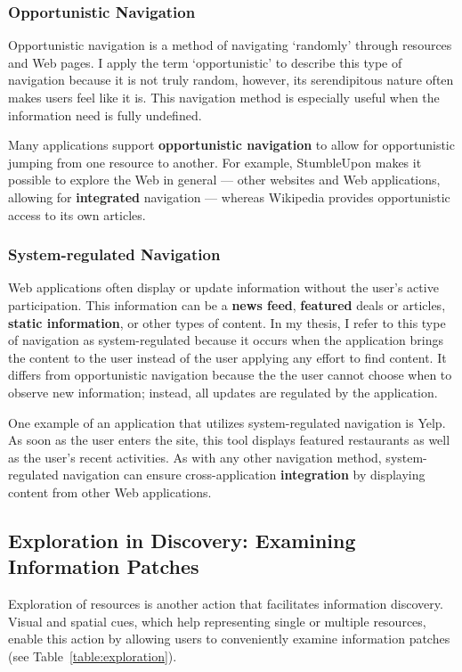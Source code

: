 {{{\subsubsection{Opportunistic Navigation}
Opportunistic navigation is a method of navigating `randomly' through resources and Web pages. I apply the term `opportunistic' to describe this type of navigation because it is not truly random, however, its serendipitous nature often makes users feel like it is. This navigation method is especially useful when the information need is fully undefined.

Many applications support \textbf{opportunistic navigation} to allow for opportunistic jumping from one resource to another. For example, StumbleUpon makes it possible to explore the Web in general --- other websites and Web applications, allowing for \textbf{integrated} navigation --- whereas Wikipedia provides opportunistic access to its own articles. 
} %

{\subsubsection{System-regulated Navigation}
Web applications often display or update information without the user's active participation. This information can be a \textbf{news feed}, \textbf{featured} deals or articles, \textbf{static information}, or other types of content. In my thesis, I refer to this type of navigation as system-regulated because it occurs when the application brings the content to the user instead of the user applying any effort to find content. It differs from opportunistic navigation because the the user cannot choose when to observe new information; instead, all updates are regulated by the application. 

One example of an application that utilizes system-regulated navigation is Yelp. As soon as the user enters the site, this tool displays featured restaurants as well as the user's recent activities. As with any other navigation method, system-regulated navigation can ensure cross-application \textbf{integration} by displaying content from other Web applications. 
} %
} %

\pagebreak
{\subsection{Exploration in Discovery: Examining Information Patches}
Exploration of resources is another action that facilitates information discovery. Visual and spatial cues, which help representing single or multiple resources, enable this action by allowing users to conveniently examine information patches (see Table~\ref{table:exploration}). 


}}

